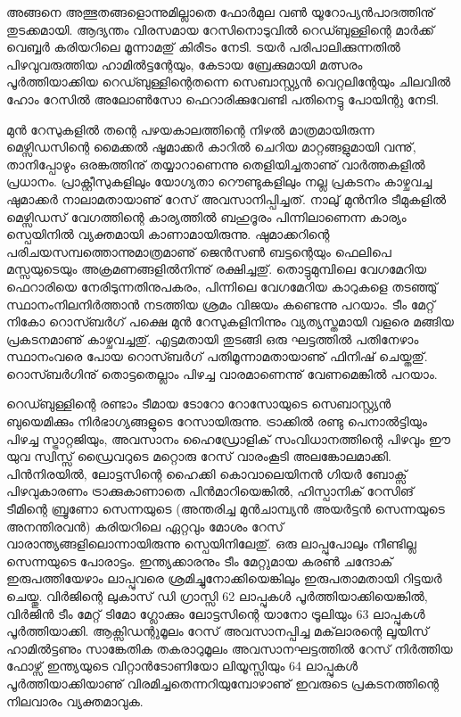 ﻿
\vskip 2pt

അങ്ങനെ അത്ഭുതങ്ങളൊന്നുമില്ലാതെ ഫോര്‍മുല വണ്‍ യൂറോപ്യന്‍പാദത്തിനു് തുടക്കമായി. ആദ്യന്തം 
വിരസമായ റേസിനൊടുവില്‍ റെഡ്ബുള്ളിന്റെ മാര്‍ക്ക് വെബ്ബര്‍ കരിയറിലെ മൂന്നാമതു് കിരീടം നേടി. 
ടയര്‍ പരിപാലിക്കുന്നതില്‍ പിഴവുവരുത്തിയ ഹാമില്‍ട്ടന്റേയും, കേടായ ബ്രേക്കുമായി മത്സരം 
പൂര്‍ത്തിയാക്കിയ റെഡ്ബുള്ളിന്റെതന്നെ സെബാസ്റ്റ്യന്‍ വെറ്റലിന്റേയും ചിലവില്‍ ഹോം റേസില്‍ 
അലോണ്‍സോ ഫെറാരിക്കുവേണ്ടി പതിനെട്ടു പോയിന്റു നേടി.

മുന്‍ റേസുകളില്‍ തന്റെ പഴയകാലത്തിന്റെ നിഴല്‍ മാത്രമായിരുന്ന മെഴ്സിഡസിന്റെ മൈക്കല്‍ ഷൂമാക്കര്‍ 
കാറില്‍ ചെറിയ മാറ്റങ്ങളുമായി വന്നു്, താനിപ്പോഴും ഒരങ്കത്തിനു് തയ്യാറാണെന്നു തെളിയിച്ചതാണു് 
വാര്‍ത്തകളില്‍ പ്രധാനം. പ്രാക്റ്റീസുകളിലും യോഗ്യതാ റൌണ്ടുകളിലും നല്ല പ്രകടനം കാഴ്ചവച്ച ഷുമാക്കര്‍ 
നാലാമതായാണു് റേസ് അവസാനിപ്പിച്ചത്. നാലു് മുന്‍നിര ടീമുകളില്‍ മെഴ്സിഡസ് വേഗത്തിന്റെ കാര്യത്തില്‍ 
ബഹുദൂരം പിന്നിലാണെന്ന കാര്യം സ്പെയിനില്‍ വ്യക്തമായി കാണാമായിരുന്നു. ഷുമാക്കറിന്റെ 
പരിചയസമ്പത്തൊന്നുമാത്രമാണു് ജെന്‍സണ്‍ ബട്ടന്റെയും ഫെലിപെ മസ്സയുടെയും അക്രമണങ്ങളില്‍നിന്നു് 
രക്ഷിച്ചതു്. തൊട്ടുമുമ്പിലെ വേഗമേറിയ ഫെറാരിയെ നേരിടുന്നതിനുപകരം, പിന്നിലെ വേഗമേറിയ കാറുകളെ 
തടഞ്ഞു് സ്ഥാനംനിലനിര്‍ത്താന്‍ നടത്തിയ ശ്രമം വിജയം കണ്ടെന്നു പറയാം. ടീം മേറ്റ് നികോ റൊസ്ബര്‍ഗ് 
പക്ഷെ മുന്‍ റേസുകളിനിന്നും വ്യത്യസ്തമായി വളരെ മങ്ങിയ പ്രകടനമാണു് കാഴ്ചവച്ചതു്. എട്ടമതായി തുടങ്ങി 
ഒരു ഘട്ടത്തില്‍ പതിനേഴാം സ്ഥാനംവരെ പോയ റൊസ്ബര്‍ഗ് പതിമൂന്നാമതായാണു് ഫിനിഷ് ചെയ്തതു്. 
റൊസ്ബര്‍ഗിനു് തൊട്ടതെല്ലാം പിഴച്ച വാരമാണെന്നു് വേണമെങ്കില്‍ പറയാം.

റെഡ്ബുള്ളിന്റെ രണ്ടാം ടീമായ ടോറോ റോസോയുടെ സെബാസ്റ്റ്യന്‍ ബുയെമിക്കും നിര്‍ഭാഗ്യങ്ങളുടെ റേസായിരുന്നു. 
ട്രാക്കില്‍ രണ്ടു പെനാല്‍ട്ടിയും പിഴച്ച സ്ട്രാറ്റജിയും, അവസാനം ഹൈഡ്രോളിക് സംവിധാനത്തിന്റെ പിഴവും ഈ യുവ 
സ്വിസ്സ് ഡ്രൈവറുടെ മറ്റൊരു റേസ് വാരംകൂടി അലങ്കോലമാക്കി. പിന്‍നിരയില്‍, ലോട്ടസിന്റെ ഹൈക്കി 
കൊവാലെയിനന്‍ ഗിയര്‍ ബോക്സ് പിഴവുകാരണം ട്രാക്കുകാണാതെ പിന്‍മാറിയെങ്കില്‍, ഹിസ്പാനിക് റേസിങ് ടീമിന്റെ 
ബ്രൂണോ സെന്നയുടെ (അന്തരിച്ച മുന്‍ചാമ്പ്യന്‍ അയര്‍ട്ടന്‍ സെന്നയുടെ അനന്തിരവന്‍) കരിയറിലെ ഏറ്റവും മോശം 
റേസ് വാരാന്ത്യങ്ങളിലൊന്നായിരുന്നു സ്പെയിനിലേതു്. ഒരു ലാപ്പുപോലും നീണ്ടില്ല സെന്നയുടെ പോരാട്ടം. ഇന്ത്യക്കാരനും 
ടീം മേറ്റുമായ കരണ്‍ ചന്ദോക് ഇരുപത്തിയേഴാം ലാപ്പുവരെ ശ്രമിച്ചുനോക്കിയെങ്കിലും ഇരുപതാമതായി റിട്ടയര്‍ ചെയ്തു. 
വിര്‍ജിന്റെ ലുകാസ് ഡി ഗ്രാസ്സി 62 ലാപ്പുകള്‍ പൂര്‍ത്തിയാക്കിയെങ്കില്‍, വിര്‍ജിന്‍ ടീം മേറ്റ് ടിമോ ഗ്ലോക്കും ലോട്ടസിന്റെ 
യാനോ ട്രൂലിയും 63 ലാപ്പുകള്‍ പൂര്‍ത്തിയാക്കി. ആക്സിഡന്റുമൂലം റേസ് അവസാനപ്പിച്ച മക്‌ലാരന്റെ ലൂയിസ് 
ഹാമില്‍ട്ടണും സാങ്കേതിക തകരാറുമൂലം അവസാനഘട്ടത്തില്‍ റേസ് നിര്‍ത്തിയ ഫോഴ്സ് ഇന്ത്യയുടെ വിറ്റാന്‍ടോണിയോ 
ലിയൂസ്സിയും 64 ലാപ്പുകള്‍ പൂര്‍ത്തിയാക്കിയാണു് വിരമിച്ചതെന്നറിയുമ്പോഴാണു് ഇവരുടെ പ്രകടനത്തിന്റെ നിലവാരം 
വ്യക്തമാവുക.

